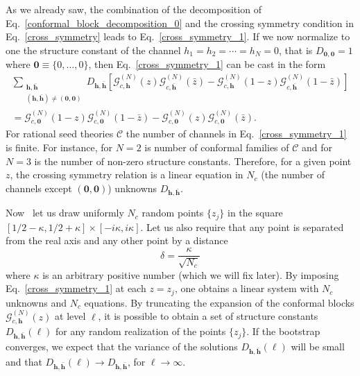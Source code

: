 \documentclass[a4paper,11pt]{article}
\begin{document}
As we already saw, the combination of the decomposition of Eq.~\eqref{conformal_block_decomposition_0}
and the crossing symmetry condition in Eq.~\eqref{cross_symmetry} leads to Eq.~\eqref{cross_symmetry_1}. 
If we now normalize to one the structure constant of the channel $h_1=h_2=\cdots=h_N=0$, that is $D_{\boldsymbol{0}, \boldsymbol{0}}=1$
where $\boldsymbol{0}\equiv \{0,\dots, 0\}$, then Eq.~\eqref{cross_symmetry_1} can be cast in the form
\begin{multline}\label{cross_symmetry_2}
\sum_{\substack{\boldsymbol{h},\boldsymbol{\bar{h}} \\ (\boldsymbol{h},\boldsymbol{\bar{h}})\neq(\boldsymbol{0},\boldsymbol{0})}}D_{\boldsymbol{h},\boldsymbol{\bar{h}}}
 \left[\mathcal{G}_{c,\boldsymbol{h}}^{(N)}(z)\mathcal{G}_{c, \boldsymbol{\bar{h}}}^{(N)}(\bar{z})-
 \mathcal{G}_{c,\boldsymbol{h}}^{(N)}(1-z)\mathcal{G}_{c,\boldsymbol{\bar{h}}}^{(N)}(1-\bar{z})\right]
 \\=\mathcal{G}_{c,\boldsymbol{0}}^{(N)}(1-z)\mathcal{G}_{c, \boldsymbol{0}}^{(N)}(1-\bar{z})-
 \mathcal{G}_{c,\boldsymbol{0}}^{(N)}(z)\mathcal{G}_{c,\boldsymbol{0}}^{(N)}(\bar{z}).
\end{multline}
For rational seed theories $\mathcal{C}$ the number of channels in Eq.~\eqref{cross_symmetry_1} is finite. For instance, for $N=2$ is number of conformal families of $\mathcal{C}$ and for $N=3$ is the number of non-zero structure constants. 
Therefore, 
for a given point $z$, the crossing symmetry relation is a linear equation in  $N_c$ (the number 
of channels except $(\boldsymbol{0}, \boldsymbol{0})$) unknowns $D_{\boldsymbol{h},\boldsymbol{\bar{h}}}$.

Now~\cite{SR} let us draw uniformly $N_c$ random points $\{z_{j}\}$ in the square $[1/2-\kappa, 1/2+\kappa]\times[-i\kappa, i\kappa]$. Let us also require that any point is separated from the real axis and any other point by a distance 
\begin{equation}
 \delta=\frac{\kappa}{\sqrt{N_c}}
\end{equation}
where $\kappa$ is an arbitrary positive number (which we will fix later). By imposing Eq.~\eqref{cross_symmetry_1} at each $z=z_j$, one obtains a linear system with $N_c$ unknowns and $N_c$ equations. By truncating the expansion of the conformal blocks $\mathcal{G}_{c, \boldsymbol{h}}^{(N)}(z)$
at level $\ell$, it is possible to obtain a set of structure constants $D_{\boldsymbol{h},\boldsymbol{\bar{h}}}(\ell)$ for any random realization of the points $\{z_j\}$. If the bootstrap converges,  we expect that the variance of the solutions $D_{\boldsymbol{h},\boldsymbol{\bar{h}}}(\ell)$ will be small and that $D_{\boldsymbol{h},\boldsymbol{\bar{h}}}(\ell)\to D_{\boldsymbol{h},\boldsymbol{\bar{h}}}$, for $\ell\to \infty$. 
\end{document}
